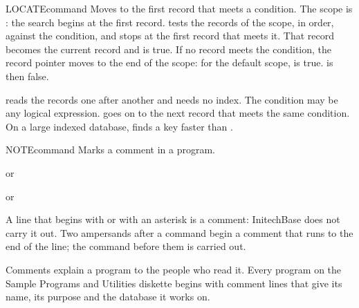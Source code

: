 \begin{XbaseEntry}{LOCATE}{command}
Moves to the first record that meets a condition.
\Syntax
{}
\Defaults
The scope is : the search begins at the first record.
\Usage
{} tests the records of the scope, in order, against the 
condition, and stops at the first record that meets it.  That record becomes
the current record and  is true.  If no record meets the
condition, the record pointer moves to the end of the scope: for the default
scope,  is true.   is then false.

 reads the records one after another and needs no index.  The
condition may be any logical expression.   goes on to the next
record that meets the same condition.
\Tips
On a large indexed database,  finds a key faster than .
\Examples
{}
\end{XbaseEntry}

\begin{XbaseEntry}{NOTE}{command}
\XAlso{*}{*}\XAlso{&&}{\&\&}%
Marks a comment in a program.
\Syntax
{}
\par or\par
{}
\par or\par
{}
\Usage
A line that begins with  or with an asterisk is a comment:
InitechBase does not carry it out.  Two ampersands after a command begin a
comment that runs to the end of the line; the command before them is carried
out.

Comments explain a program to the people who read it.  Every program on the
Sample Programs and Utilities diskette begins with comment lines that give its
name, its purpose and the database it works on.
\Examples
{}
\end{XbaseEntry}

